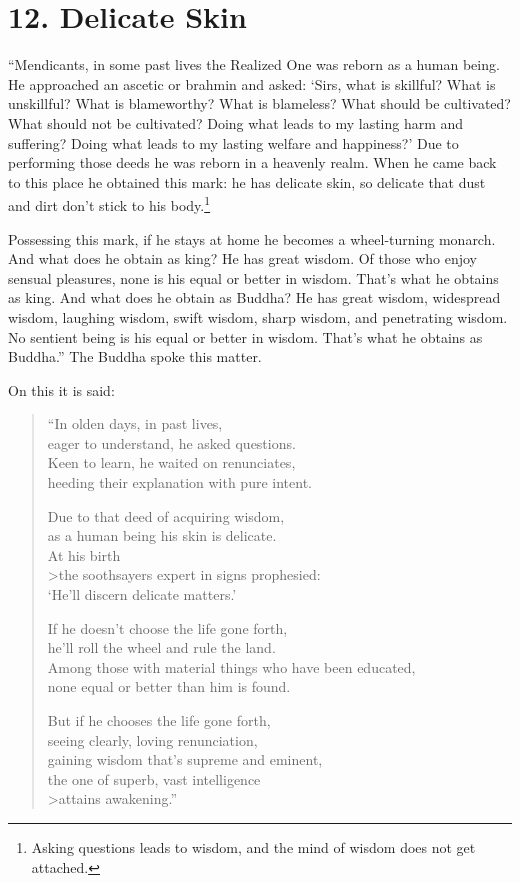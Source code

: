 \documentclass[12pt,openany]{book}%
\begin{document}
\section*{12. Delicate Skin }

“Mendicants, in some past lives the Realized One was reborn as a human being. He approached an ascetic or brahmin and asked: ‘Sirs, what is skillful? What is unskillful? What is blameworthy? What is blameless? What should be cultivated? What should not be cultivated? Doing what leads to my lasting harm and suffering? Doing what leads to my lasting welfare and happiness?’ Due to performing those deeds he was reborn in a heavenly realm. When he came back to this place he obtained this mark: he has delicate skin, so delicate that dust and dirt don’t stick to his body.\footnote{Asking questions leads to wisdom, and the mind of wisdom does not get attached. } 

Possessing this mark, if he stays at home he becomes a wheel-turning monarch. And what does he obtain as king? He has great wisdom. Of those who enjoy sensual pleasures, none is his equal or better in wisdom. That’s what he obtains as king. And what does he obtain as Buddha? He has great wisdom, widespread wisdom, laughing wisdom, swift wisdom, sharp wisdom, and penetrating wisdom. No sentient being is his equal or better in wisdom. That’s what he obtains as Buddha.” The Buddha spoke this matter. 

On this it is said: 

\begin{verse}%
“In olden days, in past lives, \\
eager to understand, he asked questions. \\
Keen to learn, he waited on renunciates, \\
heeding their explanation with pure intent. 

Due to that deed of acquiring wisdom, \\
as a human being his skin is delicate. \\
At his birth \\>the soothsayers expert in signs prophesied: \\
‘He’ll discern delicate matters.’ 

If he doesn’t choose the life gone forth, \\
he’ll roll the wheel and rule the land. \\
Among those with material things who have been educated, \\
none equal or better than him is found. 

But if he chooses the life gone forth, \\
seeing clearly, loving renunciation, \\
gaining wisdom that’s supreme and eminent, \\
the one of superb, vast intelligence \\>attains awakening.” 

%
\end{verse}
\end{document}
